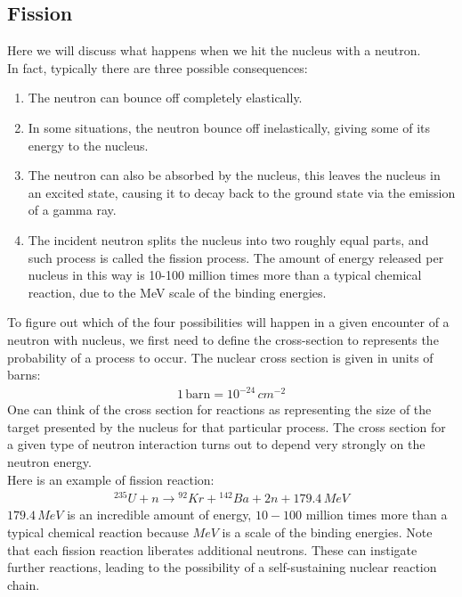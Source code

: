 \documentclass[11pt]{article}
\theoremstyle{break}
\theoremstyle{break}
\begin{document}
\subsection{Fission}
Here we will discuss what happens when we hit the nucleus with a neutron.\\ In fact, typically there are three possible consequences:
\begin{enumerate}
\item The neutron can bounce off completely elastically. 
\item In some situations, the neutron bounce off inelastically, giving some of its energy to the nucleus. 
\item The neutron can also be absorbed by the nucleus, this leaves the nucleus in an excited state, causing it to decay back to the ground state via the emission of a gamma ray. 
\item The incident neutron splits the nucleus into two roughly equal parts, and such process is called the fission process. The amount of energy released per nucleus in this way is 10-100 million times more than a typical chemical reaction, due to the MeV scale of the binding energies.
\end{enumerate}

To figure out which of the four possibilities will happen in a given encounter of a neutron with nucleus, we first need to define the cross-section to represents the probability of a process to occur. The nuclear cross section is given in units of barns:
\begin{align*}
1\, \text{barn} = 10^{-24}\, cm^{-2}
\end{align*}
One can think of the cross
section for reactions as representing the size of the target presented by
the nucleus for that particular process. The cross section for a given type of neutron interaction turns out to depend very strongly on the neutron energy.\\

Here is an example of fission reaction:
\begin{align*}
^{235}U + n \to {}^{92}Kr + {}^{142}Ba+2n + 179.4\, MeV
\end{align*}
$179.4\, MeV$ is an incredible amount of energy, $10-100$ million times more than a typical chemical reaction because $MeV$ is a scale of the binding energies. Note that each fission reaction liberates additional
neutrons. These can instigate further reactions, leading to the possibility of a self-sustaining
nuclear reaction chain.\\
\end{document}

